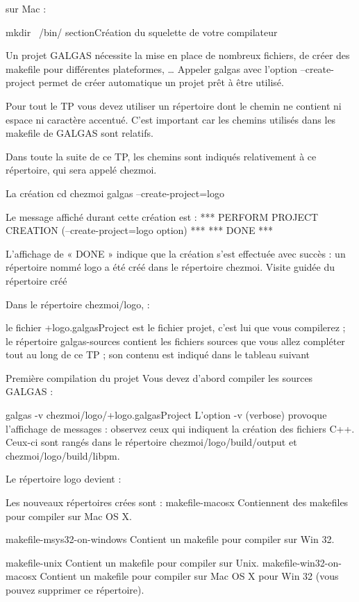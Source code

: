 sur Mac :

mkdir ~/bin/
section{Création du squelette de votre compilateur}

Un projet GALGAS nécessite la mise en place de nombreux fichiers, de créer des makefile pour différentes plateformes, … Appeler galgas avec l'option --create-project permet de créer automatique un projet prêt à être utilisé.

Pour tout le TP vous devez utiliser un répertoire dont le chemin ne contient ni espace ni caractère accentué. C'est important car les chemins utilisés dans les makefile de GALGAS sont relatifs.

Dans toute la suite de ce TP, les chemins sont indiqués relativement à ce répertoire, qui sera appelé chezmoi.

La création
	cd chezmoi
	galgas --create-project=logo

Le message affiché durant cette création est :
*** PERFORM PROJECT CREATION (--create-project=logo option) ***
*** DONE ***

L’affichage de « DONE » indique que la création s’est effectuée avec succès : un répertoire nommé logo a été créé dans le répertoire chezmoi.
Visite guidée du répertoire créé

Dans le répertoire chezmoi/logo, :

le fichier +logo.galgasProject est le fichier projet, c’est lui que vous compilerez ;
le répertoire galgas-sources contient les fichiers sources que vous allez compléter tout au long de ce TP ; son contenu est indiqué dans le tableau suivant

Première compilation du projet
Vous devez d'abord compiler les sources GALGAS :

	galgas -v chezmoi/logo/+logo.galgasProject
L'option -v (verbose) provoque l'affichage de messages : observez ceux qui indiquent la création des fichiers C++. Ceux-ci sont rangés dans le répertoire chezmoi/logo/build/output et chezmoi/logo/build/libpm.

Le répertoire logo devient :

Les nouveaux répertoires crées sont :
makefile-macosx	Contiennent des makefiles pour compiler sur Mac OS X.

makefile-msys32-on-windows	Contient un makefile pour compiler sur Win 32.

makefile-unix	Contient un makefile pour compiler sur Unix.
makefile-win32-on-macosx	Contient un makefile pour compiler sur Mac OS X pour Win 32 (vous pouvez supprimer ce répertoire).

